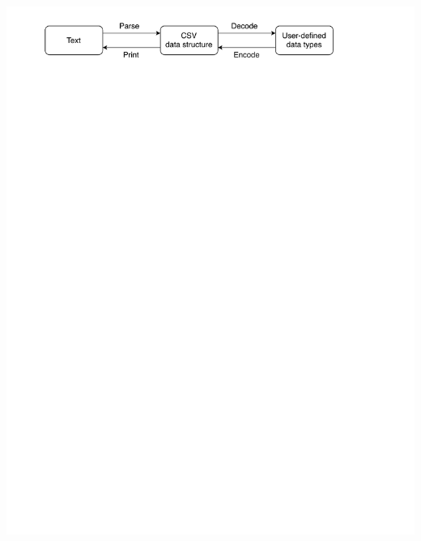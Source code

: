 \documentclass[UKenglish,usenames,dvipsnames,svgnames,table,aspectratio=169,mathserif]{beamer}
\newcommand{\nl}{\vspace{\baselineskip}}
\begin{document}
\begin{frame}
\centering \nl \nl \nl \nl \nl
\includegraphics[scale=0.8]{diagrams/parsedecodeencodeprint2.pdf}
\end{frame}
\end{document}
